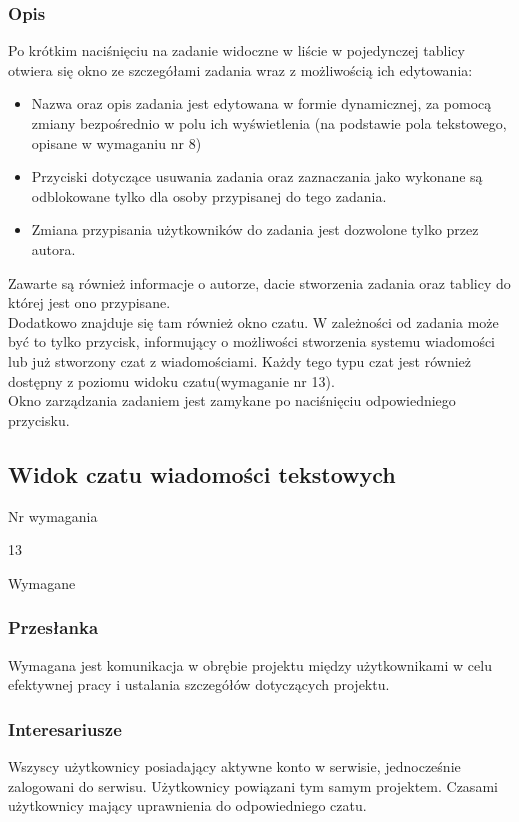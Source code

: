 \documentclass[eng,printmode]{mgr}
\begin{document}
\subsubsection{Opis}
Po krótkim naciśnięciu na zadanie widoczne w liście w pojedynczej tablicy otwiera się okno ze szczegółami zadania wraz z możliwością ich edytowania:
\begin{itemize}
  \item[--] Nazwa oraz opis zadania jest edytowana w formie dynamicznej, za pomocą zmiany bezpośrednio w polu ich wyświetlenia (na podstawie pola tekstowego, opisane w wymaganiu nr 8)
  \item[--] Przyciski dotyczące usuwania zadania oraz zaznaczania jako wykonane są odblokowane tylko dla osoby przypisanej do tego zadania.
  \item[--] Zmiana przypisania użytkowników do zadania jest dozwolone tylko przez autora.
\end{itemize}
Zawarte są również informacje o autorze, dacie stworzenia zadania oraz tablicy do której jest ono przypisane. \\
Dodatkowo znajduje się tam również okno czatu. W zależności od zadania może być to tylko przycisk, informujący o możliwości stworzenia systemu wiadomości lub już stworzony czat z wiadomościami. Każdy tego typu czat jest również dostępny z poziomu widoku czatu(wymaganie nr  13).\\
Okno zarządzania zadaniem jest zamykane po naciśnięciu odpowiedniego przycisku.
\newpage

\subsection{Widok czatu wiadomości tekstowych}
\begin{labeling}{Nr wymagania}
\item [Nr wymagania:] 13
\item [Priorytet:] Wymagane
\end{labeling}

\subsubsection{Przesłanka}
Wymagana jest komunikacja w obrębie projektu między użytkownikami w celu efektywnej pracy i ustalania szczegółów dotyczących projektu.

\subsubsection{Interesariusze}
Wszyscy użytkownicy posiadający aktywne konto w serwisie, jednocześnie zalogowani do serwisu. Użytkownicy powiązani tym samym projektem. Czasami użytkownicy mający uprawnienia do odpowiedniego czatu.
\end{document}
